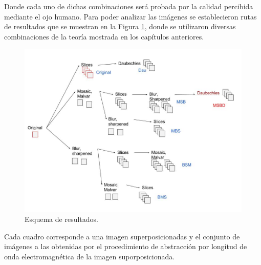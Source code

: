 Donde cada uno de dichas combinaciones será probada por la calidad percibida mediante el ojo humano. 
Para poder analizar las imágenes se establecieron rutas de resultados que se muestran en la Figura \ref{pics:squeme}, donde se utilizaron diversas combinaciones de la teoría mostrada en los capítulos anteriores.
\clearpage
\begin{figure}[h]
\includegraphics[scale=.4]{./images/RESULTS/squeme.jpg}
\caption{Esquema de resultados.}
\label{pics:squeme}
\end{figure}
Cada cuadro corresponde a una imagen superposicionadas y el conjunto de imágenes a las obtenidas por el procedimiento de abstracción por longitud de onda electromagnética de la imagen suporposicionada. 